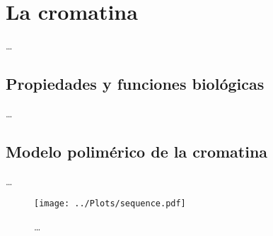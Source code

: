 \chapter{La cromatina}
\label{cap:chromatin}

\dots

\section{Propiedades y funciones biológicas}

\dots

\section{Modelo polimérico de la cromatina}

\dots

\begin{figure}
    \centering
    \texttt{[image: ../Plots/sequence.pdf]}
    \caption{\dots}
    \label{fig:sequence}
\end{figure}
